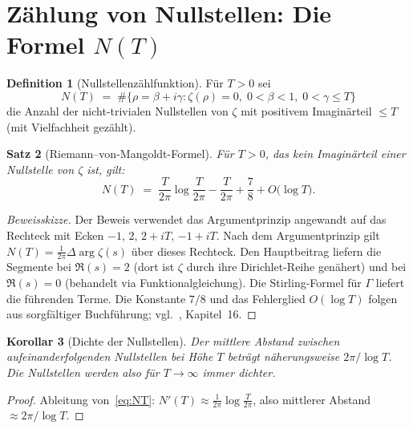 \documentclass[12pt,a4paper]{amsart}
\newtheorem{theorem}{Satz}[section]
\newtheorem{corollary}[theorem]{Korollar}
\theoremstyle{definition}
\newtheorem{definition}[theorem]{Definition}
\begin{document}
\section{Z\"ahlung von Nullstellen: Die Formel \texorpdfstring{$N(T)$}{N(T)}}

\begin{definition}[Nullstellenz\"ahlfunktion]
\label{def:NT}
F\"ur $T > 0$ sei
\[
  N(T) \;=\; \#\bigl\{\rho = \beta + i\gamma : \zeta(\rho) = 0,\;
  0 < \beta < 1,\; 0 < \gamma \le T\bigr\}
\]
die Anzahl der nicht-trivialen Nullstellen von $\zeta$ mit positivem
Imagin\"arteil $\le T$ (mit Vielfachheit gez\"ahlt).
\end{definition}

\begin{theorem}[Riemann--von-Mangoldt-Formel]
\label{thm:NT}
F\"ur $T > 0$, das kein Imagin\"arteil einer Nullstelle von $\zeta$ ist,
gilt:
\begin{equation}
  \label{eq:NT}
  N(T) \;=\; \frac{T}{2\pi}\log\frac{T}{2\pi} - \frac{T}{2\pi}
            + \frac{7}{8} + O\!\bigl(\log T\bigr).
\end{equation}
\end{theorem}

\begin{proof}[Beweisskizze]
Der Beweis verwendet das Argumentprinzip angewandt auf das Rechteck
mit Ecken $-1$, $2$, $2+iT$, $-1+iT$.
Nach dem Argumentprinzip gilt $N(T) = \tfrac{1}{2\pi}\Delta\arg\zeta(s)$
\"uber dieses Rechteck.
Den Hauptbeitrag liefern die Segmente bei $\Re(s) = 2$
(dort ist $\zeta$ durch ihre Dirichlet-Reihe gen\"ahert)
und bei $\Re(s) = 0$ (behandelt via Funktionalgleichung).
Die Stirling-Formel f\"ur $\Gamma$ liefert die f\"uhrenden Terme.
Die Konstante $7/8$ und das Fehlerglied $O(\log T)$ folgen aus
sorgf\"altiger Buchf\"uhrung; vgl.\ \cite{Davenport2000}, Kapitel~16.
\end{proof}

\begin{corollary}[Dichte der Nullstellen]
Der mittlere Abstand zwischen aufeinanderfolgenden Nullstellen bei
H\"ohe $T$ betr\"agt n\"aherungsweise $2\pi/\log T$.
Die Nullstellen werden also f\"ur $T \to \infty$ immer dichter.
\end{corollary}

\begin{proof}
Ableitung von~\eqref{eq:NT}: $N'(T) \approx \frac{1}{2\pi}\log\frac{T}{2\pi}$,
also mittlerer Abstand $\approx 2\pi/\log T$.
\end{proof}
\end{document}
